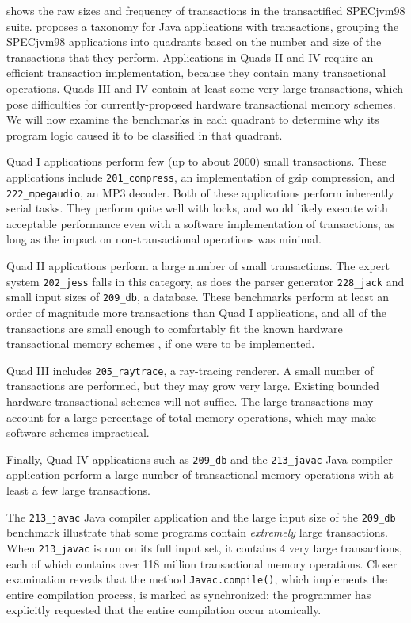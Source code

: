  shows the raw sizes and frequency of transactions in
the transactified SPECjvm98 suite.
 proposes a
taxonomy for Java applications with transactions, grouping the SPECjvm98
applications into quadrants based on the number and size of the
transactions that they perform.  Applications in Quads II and IV
require an efficient transaction implementation, because they contain
many transactional operations.
Quads III and IV contain at least some very large transactions, which
pose difficulties for currently-proposed hardware transactional memory
schemes.  We will now
examine the benchmarks in each quadrant to determine why its program
logic caused it to be classified in that quadrant.

Quad I applications perform few (up to about 2000) small
transactions.  These applications include \texttt{201\_compress}, an
implementation of gzip compression, and \texttt{222\_mpegaudio}, an
MP3 decoder.  Both of these applications perform inherently serial
tasks.  They perform quite well with locks, and would likely execute
with acceptable performance even with a \naive software
implementation of transactions, as long as the impact on
non-transactional operations was minimal.

Quad II applications perform a large number of small transactions.
The expert system \texttt{202\_jess} falls in this category, as does
the parser generator \texttt{228\_jack} and
small input sizes of \texttt{209\_db}, a database.  These benchmarks
perform at least an order of magnitude more transactions than Quad
I applications, and all of the transactions are small enough to 
comfortably fit the known hardware transactional memory schemes
\cite[etc]{HerlihyMo93}, if
one were to be implemented.

Quad III includes \texttt{205\_raytrace}, a ray-tracing renderer.  A
small number of transactions are performed, but they may grow very
large.  Existing bounded hardware transactional schemes will not
suffice.  The large
transactions may account for a large percentage of total memory
operations, which may make software schemes
impractical.

Finally, Quad IV applications such as \texttt{209\_db} and the
\texttt{213\_javac} Java compiler application perform a large number
of transactional memory operations with at least a few large transactions.  

The \texttt{213\_javac} Java compiler application and the large input
size of the \texttt{209\_db} benchmark illustrate that some programs
contain \emph{extremely} large transactions.  When \texttt{213\_javac}
is run on its full input set, it contains 4 very large transactions,
each of which contains over 118 million transactional memory
operations.  Closer
examination reveals that the method \texttt{Javac.compile()}, which
implements the entire compilation process, is marked as synchronized:
the programmer has explicitly requested that the entire compilation
occur atomically.

